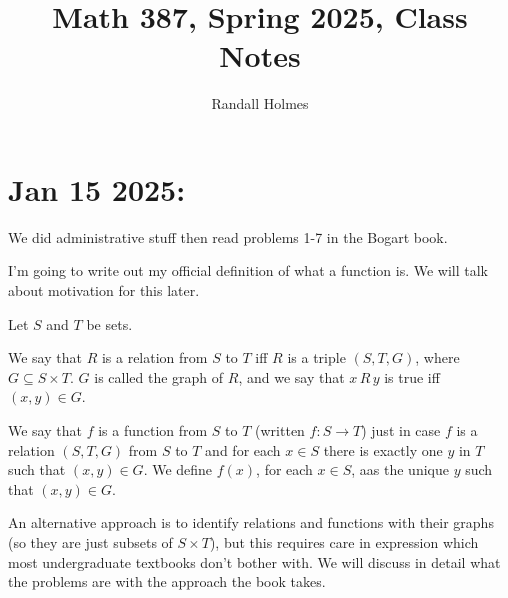 \documentclass[12pt]{article}
\title{Math 387, Spring 2025, Class Notes}
\author{Randall Holmes}
\begin{document}
\maketitle

\tableofcontents

\newpage

\section{Jan 15 2025:}  We did administrative stuff then read problems 1-7 in the Bogart book.

I'm going to write out my official definition of what a function is.  We will talk about motivation for this later.

Let $S$ and $T$ be sets.

We say that $R$ is a relation from $S$ to $T$ iff $R$ is a triple $(S,T,G)$, where $G \subseteq S \times T$.  $G$ is called the graph of $R$, and we say that $x \, R \, y$ is true iff $(x,y) \in G$.

We say that $f$ is a function from $S$ to $T$ (written $f:S \rightarrow T$) just in case $f$ is a relation $(S,T,G)$ from
$S$ to $T$ and for each $x \in S$ there is exactly one $y$ in $T$ such that $(x,y) \in G$.  We define $f(x)$, for each $x \in S$, aas the unique $y$ such that $(x,y) \in G$.

An alternative approach is to identify relations and functions with their graphs (so they are just subsets of $S \times T$), but this requires care in expression which most undergraduate textbooks don't bother with.  We will discuss in detail what the problems are with the approach the book takes.
\end{document}

